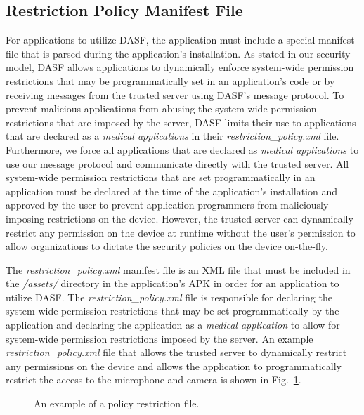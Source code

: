 \subsection{Restriction Policy Manifest File}  
For applications to utilize DASF, the application must include a
special manifest file that is parsed during the application's
installation.  As stated in our security model, DASF allows
applications to dynamically enforce system-wide permission
restrictions that may be programmatically set in an application's code
or by receiving messages from the trusted server using DASF's message
protocol. To prevent malicious applications from abusing the
system-wide permission restrictions that are imposed by the server,
DASF limits their use to applications that are declared as
a \textit{medical applications} in
their \textit{restriction\_policy.xml} file.  Furthermore, we force
all applications that are declared as \textit{medical applications} to
use our message protocol and communicate directly with the trusted 
server.  All system-wide permission restrictions that are set
programmatically in an application must be declared at the time
of the application's installation and approved by the user to
prevent application programmers from maliciously imposing restrictions
on the device. However, the trusted server can dynamically restrict
any permission on the device at runtime without the user's permission
to allow organizations to dictate the security policies on the device
on-the-fly. 

The \textit{restriction\_policy.xml} manifest file is an XML file that
must be included in the \textit{/assets/} directory in the
application's APK in order for an application to utilize
DASF. The \textit{restriction\_policy.xml} file is responsible for
declaring the system-wide permission restrictions that may be set
programmatically by the application and declaring the application as
a \textit{medical application} to allow for system-wide permission
restrictions imposed by the server. An
example \textit{restriction\_policy.xml} file that allows the trusted
server to dynamically restrict any permissions on the device and
allows the application to programmatically restrict the access to the
microphone and camera is shown in Fig.~\ref{fig:policy}.  

\begin{figure}[ht]
\centering
{}
\caption{An example of a policy restriction file.}
\label{fig:policy}
\end{figure}

